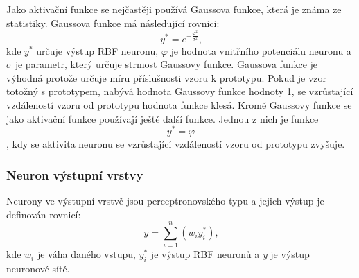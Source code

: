 \documentclass[11pt,twoside,a4paper]{book}
\begin{document}
Jako aktivační funkce se nejčastěji používá Gaussova funkce, která je známa ze statistiky. Gaussova funkce má následující rovnici:
\begin{equation}
y^{*}=e^{-\frac{\varphi^{2}}{\sigma^{2}}}\mbox{,}
\end{equation}
kde \begin{math}y^{*}\end{math} určuje výstup RBF neuronu, \begin{math}\varphi\end{math} je hodnota vnitřního potenciálu neuronu a \begin{math}\sigma\end{math} je parametr, který určuje strmost Gaussovy funkce. Gaussova funkce je výhodná protože určuje míru příslušnosti vzoru k prototypu. Pokud je vzor totožný s prototypem, nabývá hodnota Gaussovy funkce hodnoty 1, se vzrůstající vzdáleností vzoru od prototypu hodnota funkce klesá. Kromě Gaussovy funkce se jako aktivační funkce používají ještě další funkce. Jednou z nich je funkce
\begin{equation}
y^{*}=\varphi
\end{equation}, kdy se aktivita neuronu se vzrůstající vzdáleností vzoru od prototypu zvyšuje.

\subsubsection{Neuron výstupní vrstvy}
Neurony ve výstupní vrstvě jsou perceptronovského typu a jejich výstup je definován rovnicí:
\begin{equation}
y=\sum\limits_{i=1}^n(w_{i}y^{*}_{i})\mbox{,}
\end{equation}
kde \begin{math}w_{i}\end{math} je váha daného vstupu, \begin{math}y^{*}_{i}\end{math} je výstup RBF neuronů a \textit{y} je výstup neuronové sítě.
\end{document}

